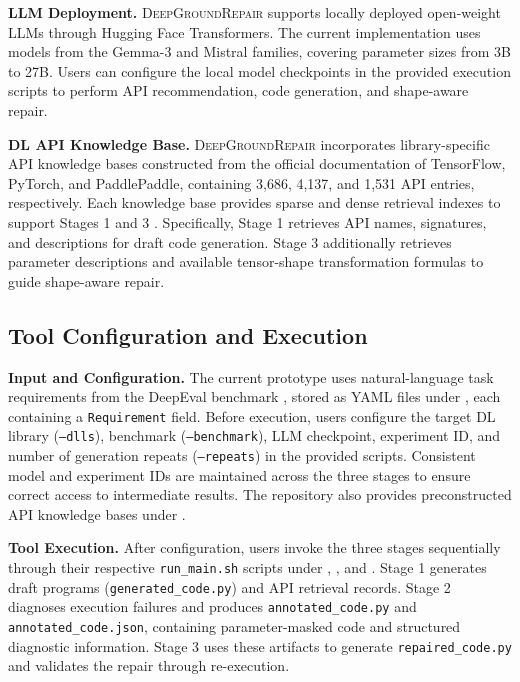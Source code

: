 \documentclass[10pt,conference]{IEEEtran}
\begin{document}
\noindent\textbf{LLM Deployment.}
\textsc{DeepGroundRepair} supports locally deployed open-weight LLMs through Hugging Face Transformers. The current implementation uses models from the Gemma-3 and Mistral families, covering parameter sizes from 3B to 27B. Users can configure the local model checkpoints in the provided execution scripts to perform API recommendation, code generation, and shape-aware repair.

\noindent\textbf{DL API Knowledge Base.}
\textsc{DeepGroundRepair} incorporates library-specific API knowledge bases constructed from the official documentation of TensorFlow, PyTorch, and PaddlePaddle, containing 3,686, 4,137, and 1,531 API entries, respectively. Each knowledge base provides sparse and dense retrieval indexes to support Stages 1 and 3 \cite{luan2021retrieval,robertson2009bm25}. Specifically, Stage 1 retrieves API names, signatures, and descriptions for draft code generation. Stage 3 additionally retrieves parameter descriptions and available tensor-shape transformation formulas to guide shape-aware repair.


\subsection{Tool Configuration and Execution}
\noindent\textbf{Input and Configuration.}
The current prototype uses natural-language task requirements from the DeepEval benchmark \cite{DeepEval}, stored as YAML files under , each containing a \texttt{Requirement} field. Before execution, users configure the target DL library (\texttt{--dlls}), benchmark (\texttt{--benchmark}), LLM checkpoint, experiment ID, and number of generation repeats (\texttt{--repeats}) in the provided scripts. Consistent model and experiment IDs are maintained across the three stages to ensure correct access to intermediate results. The repository also provides preconstructed API knowledge bases under .



\noindent\textbf{Tool Execution.}
After configuration, users invoke the three stages sequentially through their respective \texttt{run\_main.sh} scripts under , , and . Stage 1 generates draft programs (\texttt{generated\_code.py}) and API retrieval records. Stage 2 diagnoses execution failures and produces
\texttt{annotated\_code.py} and \texttt{annotated\_code.json}, containing parameter-masked code and structured diagnostic information. Stage 3 uses these artifacts to generate \texttt{repaired\_code.py} and validates the repair through re-execution.
\end{document}
